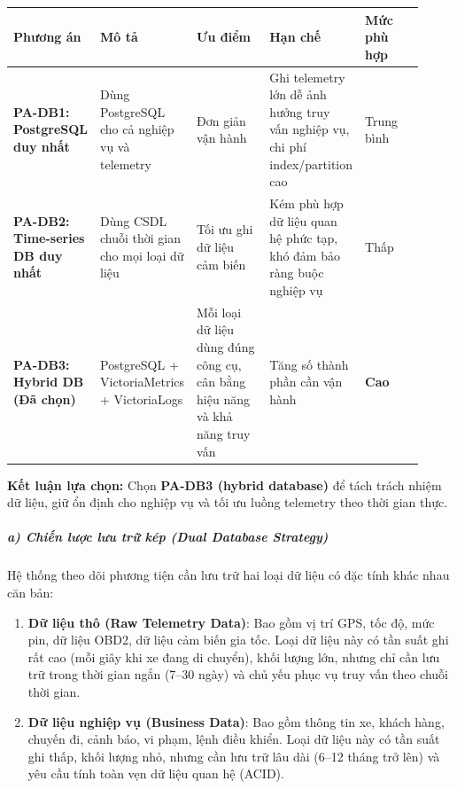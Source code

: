 \documentclass[13pt,a4paper]{extarticle}
\newcounter{none} %
\newcommand{\thesislongtableorignewline}{}
\let\thesislongtableorignewline\\
\renewcommand{\\}{\thesislongtableorignewline\hline}%
\let\\\thesislongtableorignewline
\providecommand{\tightlist}{%
  \setlength{\itemsep}{0pt}\setlength{\parskip}{0pt}}
\begin{document}
{\def\LTcaptype{none} %
\begin{longtable}{|p{0.12\linewidth}|p{0.10\linewidth}|p{0.30\linewidth}|p{0.20\linewidth}|p{0.20\linewidth}|}
\hline \textbf{Phương án} & \textbf{Mô tả} & \textbf{Ưu điểm} & \textbf{Hạn chế} & \textbf{Mức phù hợp} \\
\hline
\endhead
\hline
\endlastfoot
\textbf{PA-DB1: PostgreSQL duy nhất} & Dùng PostgreSQL cho cả nghiệp vụ
và telemetry & Đơn giản vận hành & Ghi telemetry lớn dễ ảnh hưởng truy
vấn nghiệp vụ, chi phí index/partition cao & Trung bình \\
\textbf{PA-DB2: Time-series DB duy nhất} & Dùng CSDL chuỗi thời gian cho
mọi loại dữ liệu & Tối ưu ghi dữ liệu cảm biến & Kém phù hợp dữ liệu
quan hệ phức tạp, khó đảm bảo ràng buộc nghiệp vụ & Thấp \\
\textbf{PA-DB3: Hybrid DB (Đã chọn)} & PostgreSQL + VictoriaMetrics +
VictoriaLogs & Mỗi loại dữ liệu dùng đúng công cụ, cân bằng hiệu năng và
khả năng truy vấn & Tăng số thành phần cần vận hành & \textbf{Cao} \\
\end{longtable}
}

\textbf{Kết luận lựa chọn:} Chọn \textbf{PA-DB3 (hybrid database)} để
tách trách nhiệm dữ liệu, giữ ổn định cho nghiệp vụ và tối ưu luồng
telemetry theo thời gian thực.

\subparagraph{a) Chiến lược lưu trữ kép (Dual Database
Strategy)}\label{a-chiux1ebfn-lux1b0ux1ee3c-lux1b0u-trux1eef-kuxe9p-dual-database-strategy}

Hệ thống theo dõi phương tiện cần lưu trữ hai loại dữ liệu có đặc tính
khác nhau căn bản:

\begin{enumerate}
\def\labelenumi{\arabic{enumi}.}
\tightlist
\item
  \textbf{Dữ liệu thô (Raw Telemetry Data)}: Bao gồm vị trí GPS, tốc độ,
  mức pin, dữ liệu OBD2, dữ liệu cảm biến gia tốc. Loại dữ liệu này có
  tần suất ghi rất cao (mỗi giây khi xe đang di chuyển), khối lượng lớn,
  nhưng chỉ cần lưu trữ trong thời gian ngắn (7--30 ngày) và chủ yếu
  phục vụ truy vấn theo chuỗi thời gian.
\item
  \textbf{Dữ liệu nghiệp vụ (Business Data)}: Bao gồm thông tin xe,
  khách hàng, chuyến đi, cảnh báo, vi phạm, lệnh điều khiển. Loại dữ
  liệu này có tần suất ghi thấp, khối lượng nhỏ, nhưng cần lưu trữ lâu
  dài (6--12 tháng trở lên) và yêu cầu tính toàn vẹn dữ liệu quan hệ
  (ACID).
\end{enumerate}
\end{document}
